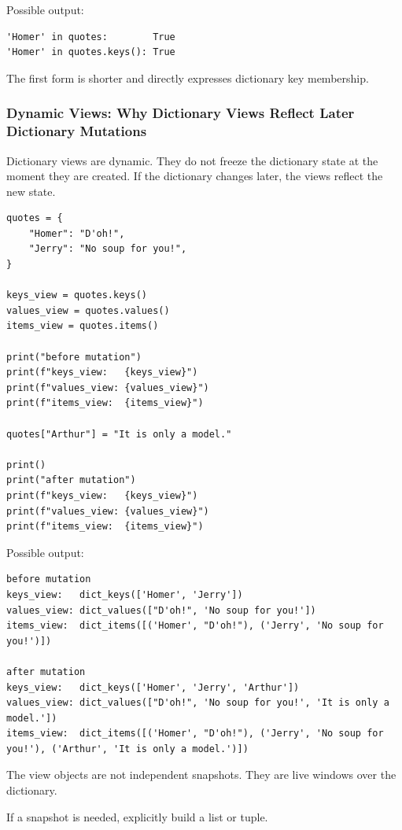 Possible output:

\begin{verbatim}
'Homer' in quotes:        True
'Homer' in quotes.keys(): True
\end{verbatim}

The first form is shorter and directly expresses dictionary key membership.

\subsubsection{Dynamic Views: Why Dictionary Views Reflect Later Dictionary Mutations}

Dictionary views are dynamic. They do not freeze the dictionary state at the moment they are created. If the dictionary changes later, the views reflect the new state.

\begin{verbatim}
quotes = {
    "Homer": "D'oh!",
    "Jerry": "No soup for you!",
}

keys_view = quotes.keys()
values_view = quotes.values()
items_view = quotes.items()

print("before mutation")
print(f"keys_view:   {keys_view}")
print(f"values_view: {values_view}")
print(f"items_view:  {items_view}")

quotes["Arthur"] = "It is only a model."

print()
print("after mutation")
print(f"keys_view:   {keys_view}")
print(f"values_view: {values_view}")
print(f"items_view:  {items_view}")
\end{verbatim}

Possible output:

\begin{verbatim}
before mutation
keys_view:   dict_keys(['Homer', 'Jerry'])
values_view: dict_values(["D'oh!", 'No soup for you!'])
items_view:  dict_items([('Homer', "D'oh!"), ('Jerry', 'No soup for you!')])

after mutation
keys_view:   dict_keys(['Homer', 'Jerry', 'Arthur'])
values_view: dict_values(["D'oh!", 'No soup for you!', 'It is only a model.'])
items_view:  dict_items([('Homer', "D'oh!"), ('Jerry', 'No soup for you!'), ('Arthur', 'It is only a model.')])
\end{verbatim}

The view objects are not independent snapshots. They are live windows over the dictionary.

If a snapshot is needed, explicitly build a list or tuple.

